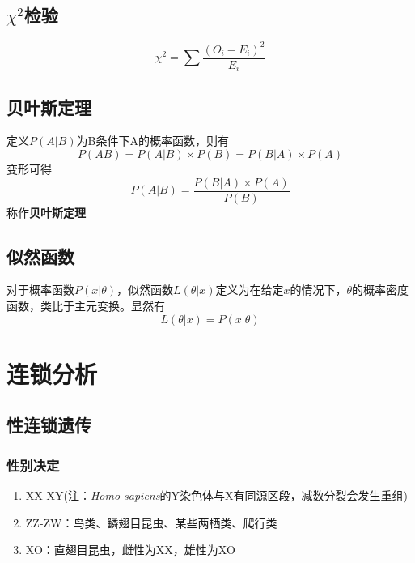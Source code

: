 \documentclass[a4paper, 12pt]{report}
\begin{document}
  \section{$\chi^2$检验}
  $$\chi^2 = \sum \dfrac{(O_i - E_i)^2}{E_i}$$
  \section{贝叶斯定理}
  定义$P(A|B)$为B条件下A的概率函数，则有$$P(AB)=P(A|B)\times P(B)=P(B|A)\times P(A)$$
  变形可得$$P(A|B)=\dfrac{P(B|A)\times P(A)}{P(B)}$$
  称作\textbf{贝叶斯定理}
  \section{似然函数}
  对于概率函数$P(x|\theta)$，似然函数$L(\theta|x)$定义为在给定$x$的情况下，$\theta$的概率密度函数，类比于主元变换。显然有$$L(\theta|x) = P(x|\theta)$$
  \chapter{连锁分析}
  \section{性连锁遗传}
  \subsection{性别决定}
  \begin{enumerate}
    \item XX-XY(注：\textit{Homo sapiens}的Y染色体与X有同源区段，减数分裂会发生重组)
    \item ZZ-ZW：鸟类、鳞翅目昆虫、某些两栖类、爬行类
    \item XO：直翅目昆虫，雌性为XX，雄性为XO
  \end{enumerate}
\end{document}
